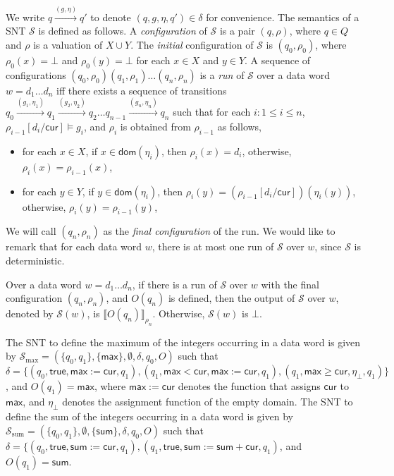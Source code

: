 \documentclass[runningheads,a4paper]{llncs}
\def\Ss{{\mathcal{S} }}
\newcommand\cur{\mathsf{cur}}
\newcommand\dom{\mathsf{dom}}
\newcommand\ltrue{\mathsf{true}}
\newcommand\maxv{\mathsf{max}}
\newcommand\sumv{\mathsf{sum}}
\newcommand{\eval}[2]{\llbracket#1\rrbracket_{#2}}
\begin{document}
We write $q \xrightarrow{(g,\eta)} q'$ to denote $(q,g,\eta,q') \in \delta$ for convenience. 
The semantics of a SNT $\Ss$  is defined as follows. A \emph{configuration} of $\Ss$ is a pair $(q,\rho)$, where $q \in Q$ and $\rho$ is a valuation of $X \cup Y$. The \emph{initial} configuration of $\Ss$ is $(q_0,\rho_0)$, where $\rho_0(x)=\bot$ and $\rho_0(y)=\bot$ for each $x \in X$ and $y \in Y$. A sequence of configurations $(q_0,\rho_0)(q_1,\rho_1)\ldots(q_n,\rho_n)$ is
a \emph{run} of $\Ss$ over a data word $w=d_1 \dots d_n$ iff there exists a sequence of transitions $q_0 \xrightarrow{(g_1,\eta_1)} q_1 \xrightarrow{(g_2,\eta_2)} q_2 \dots q_{n-1} \xrightarrow{(g_n, \eta_n)} q_n$ such that for each $i: 1 \le i \le n$, $\rho_{i-1}[d_i/\cur]  \models g_i$, and $\rho_i$ is obtained from $\rho_{i-1}$ as follows,
\begin{itemize}
\item for each $x \in X$, if $ x \in \dom(\eta_i)$, then $\rho_i(x)=d_i$, otherwise, $\rho_i(x)=\rho_{i-1}(x)$,
%
\item for each $y \in Y$, if $y \in \dom(\eta_i)$, then $\rho_i(y)=(\rho_{i-1}[d_i/\cur])(\eta_i(y))$, otherwise, $\rho_i(y)=\rho_{i-1}(y)$,
\end{itemize}
We will call $(q_n,\rho_n)$ as the \emph{final configuration} of the run.
We would like to remark that for each data word $w$, there is at most one run of $\Ss$ over $w$, since $\Ss$ is deterministic. 

Over a data word $w = d_1 \dots d_n$, if there is a run of $\Ss$ over $w$ with the final configuration $(q_n,\rho_n)$, and $O(q_n)$ is defined, then the output of $\Ss$ over $w$, denoted by ${\Ss}(w)$, is $\eval{O(q_n)}{\rho_n}$. Otherwise, ${\Ss}(w)$ is $\bot$.

\begin{example}
The SNT to define the maximum of the integers occurring in a data word is given by $\Ss_{\max}=(\{q_0,q_1\}, \{\maxv\}, \emptyset, \delta, q_0, O)$  such that $\delta = \{(q_0, \ltrue, \maxv:=\cur, q_1), (q_1, \maxv < \cur, \maxv:=\cur,q_1), (q_1, \maxv \ge \cur, \eta_\bot, q_1)\}$, and $O(q_1)=\maxv$, where $\maxv:=\cur$ denotes the function that assigns $\cur$ to $\maxv$, and $\eta_\bot$ denotes the assignment function of the empty domain. The SNT to define the sum of the integers occurring in a data word is given by $\Ss_{\mathrm{sum}}=(\{q_0,q_1\}, \emptyset, \{\sumv\}, \delta, q_0, O)$ such that $\delta=\{(q_0, \ltrue, \sumv:=\cur, q_1), (q_1, \ltrue, \sumv:=\sumv + \cur, q_1)$, and $O(q_1)=\sumv$. 
\end{example}
\end{document}
